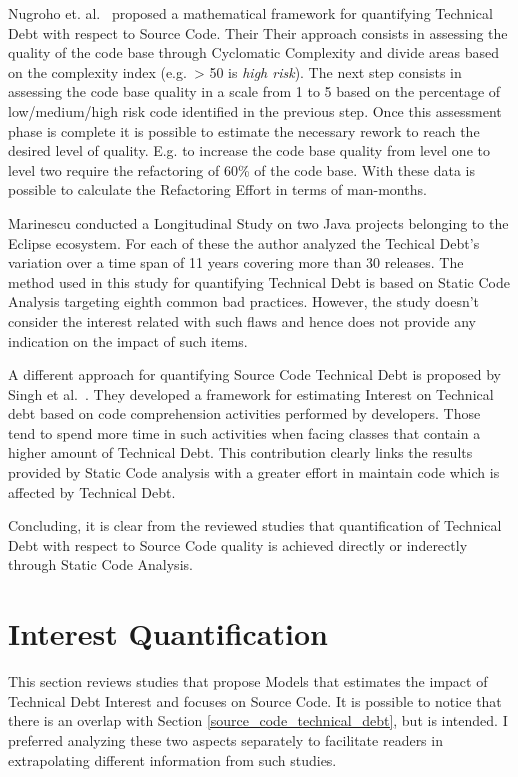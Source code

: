 Nugroho et. al.\ \cite{technicalDebtInterest} proposed a mathematical framework for quantifying Technical Debt with respect to Source Code. Their Their approach consists in assessing the quality of the code base through Cyclomatic Complexity \cite{cyclomatic_complexity} and divide areas based on the complexity index (e.g.\ > 50 is \textit{high risk}). The next step consists in assessing the code base quality in a scale from 1 to 5 based on the percentage of low/medium/high risk code identified in the previous step. Once this assessment phase is complete it is possible to estimate the necessary rework to reach the desired level of quality. E.g. to increase the code base quality from level one to level two require the refactoring of 60\% of the code base. With these data is possible to calculate the Refactoring Effort in terms of man-months.

Marinescu \cite{assessing_technical_debt_eclipse} conducted a Longitudinal Study on two Java projects belonging to the Eclipse ecosystem. For each of these the author analyzed the Techical Debt's variation over a time span of 11 years covering more than 30 releases. The method used in this study for quantifying Technical Debt is based on Static Code Analysis targeting eighth common bad practices. However, the study doesn't consider the interest related with such flaws and hence does not provide any indication on the impact of such items.

A different approach for quantifying Source Code Technical Debt is proposed by Singh et al.\ \cite{code_td_comprehension_activities}. They developed a framework for estimating Interest on Technical debt based on code comprehension activities performed by developers. Those tend to spend more time in such activities when facing classes that contain a higher amount of Technical Debt. This contribution clearly links the results provided by Static Code analysis with a greater effort in maintain code which is affected by Technical Debt.

Concluding, it is clear from the reviewed studies that quantification of Technical Debt with respect to Source Code quality is achieved directly or inderectly through Static Code Analysis.


\section{Interest Quantification}

This section reviews studies that propose Models that estimates the impact of Technical Debt Interest and focuses on Source Code. It is possible to notice that there is an overlap with Section \ref{source_code_technical_debt}, but is intended. I preferred analyzing these two aspects separately to facilitate readers in extrapolating different information from such studies.

